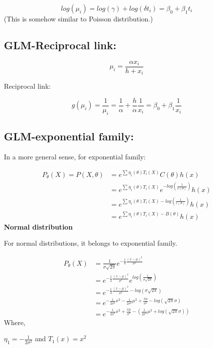 \documentclass[]{book}
\begin{document}
\[log(\mu_i) = log(\gamma) + log(\delta t_i)=\beta_0+\beta_1 t_i\]
(This is somehow similar to Poisson distribution.)

\hypertarget{glm-reciprocal-link}{%
\subsection{GLM-Reciprocal link:}\label{glm-reciprocal-link}}

\[\mu_i=\frac{\alpha x_i}{h+x_i}\]

Reciprocal link:

\[g(\mu_i)=\frac{1}{\mu_i}=\frac{1}{\alpha}+\frac{h}{\alpha}\frac{1}{x_i}=\beta_0+\beta_1 \frac{1}{x_i}\]

\hypertarget{glm-exponential-family}{%
\subsection{GLM-exponential family:}\label{glm-exponential-family}}

In a more general sense, for exponential family:

\[\begin{aligned} P_{\theta}(X)=P(X, \theta)&= e^{\sum \eta_i(\theta)T_i(X)} C(\theta)h(x)\\ &=e^{\sum \eta_i(\theta)T_i(X)} e^{-log(\frac{1}{c(\theta)})}h(x) \\ &= e^{\sum \eta_i(\theta)T_i(X)-log(\frac{1}{c(\theta)})} h(x)  \\&= e^{\sum \eta_i(\theta)T_i(X)-B(\theta)} h(x) \end{aligned}\]
\textbf{Normal distribution}

For normal distributions, it belongs to exponential family.

\[\begin{aligned} P_{\theta}(X) &= \frac{1}{\sigma\sqrt{2\pi}} e^{-\frac{1}{2}\frac{(x-\mu)^2}{\sigma^2}}\\ &=e^{-\frac{1}{2}\frac{(x-\mu)^2}{\sigma^2}} e^{log(\frac{1}{\sigma\sqrt{2\pi}})} \\ &= e^{-\frac{1}{2}\frac{(x-\mu)^2}{\sigma^2}-log (\sigma\sqrt{2\pi})} \\ &= e^{-\frac{1}{2\sigma^2}x^2-\frac{1}{2\sigma^2} \mu^2+\frac{x\mu}{\sigma^2}-log(\sqrt{2\pi}\sigma)}\\ &=e^{-\frac{1}{2\sigma^2}x^2+\frac{x\mu}{\sigma^2}-(\frac{1}{2\sigma^2} \mu^2+log(\sqrt{2\pi}\sigma))} \end{aligned}\]
Where,

\(\eta_1 =-\frac{1}{2\sigma^2}\) and \(T_1(x)=x^2\)
\end{document}
